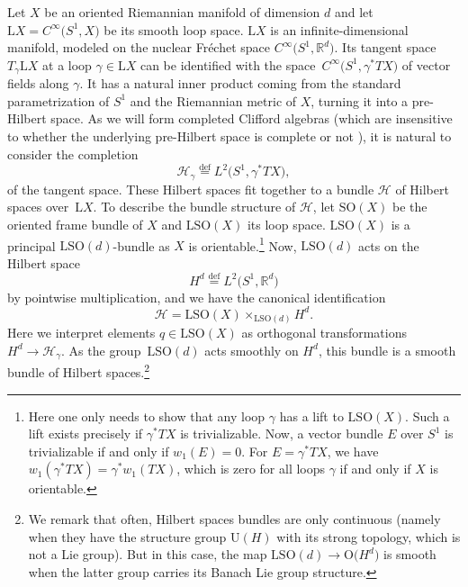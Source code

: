 \documentclass[10pt,a4paper]{amsart}
\numberwithin{equation}{section}
\newcommand{\R}{\mathbb{R}}
\newcommand{\Cl}{\mathrm{Cl}}
\newcommand{\SO}{\mathrm{SO}}
\newcommand{\U}{\mathrm{U}}
\renewcommand{\O}{\mathrm{O}}
\renewcommand{\L}{\mathrm{L}}
\newcommand{\defeq}{\stackrel{\mathrm{def}}{=}}
\begin{document}
Let $X$ be an oriented Riemannian manifold of dimension $d$ and let $\L X = C^\infty\big(S^1, X\big)$ be its smooth loop space.
$\L X$ is an infinite-dimensional manifold, modeled on the nuclear Fr\'echet space $C^\infty\big(S^1, \R^d\big)$.
Its tangent space $T_\gamma \L X$ at a loop $\gamma \in \L X$ can be identified with the space~$C^\infty\big(S^1, \gamma^*TX\big)$ of vector fields along $\gamma$.
It has a natural inner product coming from the standard parametrization of $S^1$ and the Riemannian metric of $X$, turning it into a pre-Hilbert space.
As we will form completed Clifford algebras (which are insensitive to whether the underlying pre-Hilbert space is complete or not \cite{PlymenRobinson}), it is natural to consider the completion
\begin{equation*}%
 \mathcal{H}_\gamma \defeq L^2\big(S^1, \gamma^* TX\big),
\end{equation*}
of the tangent space.
These Hilbert spaces fit together to a bundle $\mathcal{H}$ of Hilbert spaces over~$\L X$.
To describe the bundle structure of $\mathcal{H}$, let $\SO(X)$ be the oriented frame bundle of $X$ and $\L \SO(X)$ its loop space.
$\L \SO(X)$ is a principal $\L \SO(d)$-bundle as $X$ is orientable.\footnote{Here one only needs to show that any loop $\gamma$ has a lift to $\L\SO(X)$. Such a lift exists precisely if $\gamma^*TX$ is trivializable.
Now, a vector bundle $E$ over $S^1$ is trivializable if and only if $w_1(E) = 0$. For $E = \gamma^*TX$, we have $w_1(\gamma^*TX) = \gamma^*w_1(TX)$, which is zero for all loops $\gamma$ if and only if $X$ is orientable.}
Now, $\L \SO(d)$ acts on the Hilbert space
\begin{equation}
\label{DefinitionHd}
 H^d \defeq L^2\big(S^1, \R^d\big)
\end{equation}
by pointwise multiplication, and we have the canonical identification
\begin{equation*}
 \mathcal{H} = \L\SO(X) \times_{\L\SO(d)} H^d.
\end{equation*}
Here we interpret elements $q \in \L \SO(X)$ as orthogonal transformations $H^d \to \mathcal{H}_\gamma$.
As the group~$\L\SO(d)$ acts smoothly on $H^d$, this bundle is a smooth bundle of Hilbert spaces.\footnote{We remark that often, Hilbert spaces bundles are only continuous (namely when they have the structure group $\U(H)$ with its strong topology, which is not a Lie group).
But in this case, the map $\L\SO(d) \to \O\big(H^d\big)$ is smooth when the latter group carries its Banach Lie group structure.}
\end{document}

